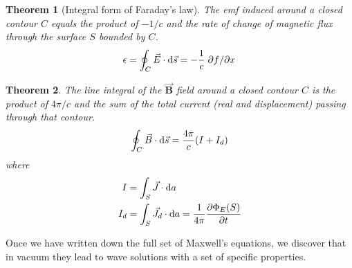 \documentclass[a4paper]{tufte-handout}
\newtheorem{theorem}{Theorem}
\theoremstyle{definition}
\begin{document}
\begin{theorem}[Integral form of Faraday's law]
  The emf induced around a closed contour $C$ equals the product of $-1/c$ and the rate of change of magnetic flux
  through the surface $S$ bounded by $C$.
  \begin{equation}
    \epsilon = \oint_C \vec{E} \cdot \differential \vec{s} = -\frac{1}{c}\pdv*{f}{x}
  \end{equation}
\end{theorem}

\begin{theorem}
  The line integral of the $\vec{\mathbf{B}}$ field around a closed contour $C$ is the product of $4 \pi / c$ and the sum of the
  total current (real and displacement) passing through that contour.
  \begin{equation}
    \oint_C \vec{B} \cdot \differential \vec{s} = \frac{4 \pi}{c} (I + I_d)
  \end{equation}
  where
  \begin{align*}
    I &= \int_S \vec{J} \cdot \differential a \\
    I_d &= \int_S \vec{J}_d \cdot \differential a = \frac{1}{4 \pi}\pdv{\Phi_E(S)}{t}
  \end{align*}
\end{theorem}

Once we have written down the full set of Maxwell's equations, we discover that in vacuum they lead to wave solutions
with a set of specific properties.



\end{document}
